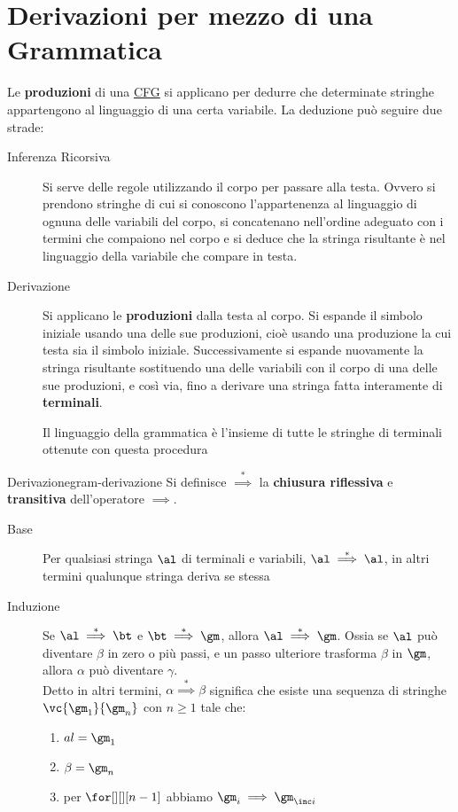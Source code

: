 \section{Derivazioni per mezzo di una Grammatica}\label{sec:ll_derivazioni_per_mezzo_di_una_grammatica} %
Le \textbf{produzioni} di una \hyperref[def:cfg]{CFG} si applicano per dedurre che determinate stringhe appartengono al linguaggio di una certa variabile.
La deduzione può seguire due strade:
\begin{description}
    \item[Inferenza Ricorsiva] Si serve delle regole utilizzando il corpo per passare alla testa.
        Ovvero si prendono stringhe di cui si conoscono l'appartenenza al linguaggio di ognuna delle variabili del corpo, si concatenano nell'ordine adeguato con i termini che compaiono nel corpo e si deduce che la stringa risultante è nel linguaggio della variabile che compare in testa. 
    \item[Derivazione] Si applicano le \textbf{produzioni} dalla testa al corpo.
        Si espande il simbolo iniziale usando una delle sue produzioni, cioè usando una produzione la cui testa sia il simbolo iniziale.
        Successivamente si espande nuovamente la stringa risultante sostituendo una delle variabili con il corpo di una delle sue produzioni, e così via, fino a derivare una stringa fatta interamente di \textbf{terminali}.
        \begin{note}
            Il linguaggio della grammatica è l'insieme di tutte le stringhe di terminali ottenute con questa procedura
        \end{note}
\end{description}
\begin{remark}{Derivazione}{gram-derivazione}
    Si definisce $\overset{*}{\implies}$ la \textbf{chiusura riflessiva} e \textbf{transitiva} dell'operatore $\implies$.
    \begin{description}
        \item[Base] Per qualsiasi stringa $\al$ di terminali e variabili, $\al\overset{*}{\implies}\al$, in altri termini qualunque stringa deriva se stessa
        \item[Induzione] Se $\al\overset{*}{\implies}\bt$ e $\bt\overset{*}{\implies}\gm$, allora $\al\overset{*}{\implies}\gm$.
            Ossia se $\al$ può diventare $\beta$ in zero o più passi, e un passo ulteriore trasforma $\beta$ in $\gm$, allora $\alpha$ può diventare $\gamma$.
            \\
            Detto in altri termini, $\alpha\overset{*}{\implies}\beta$ significa che esiste una sequenza di stringhe $\vc{\gm_1}{\gm_n}$ con $n\ge1$ tale che:
            \begin{enumerate}
                \item $al = \gm_1$
                \item $\beta = \gm_n$
                \item per $\for[][][n-1]$ abbiamo $\gm_i \implies \gm_{\inc i}$
            \end{enumerate}
    \end{description}
\end{remark}
